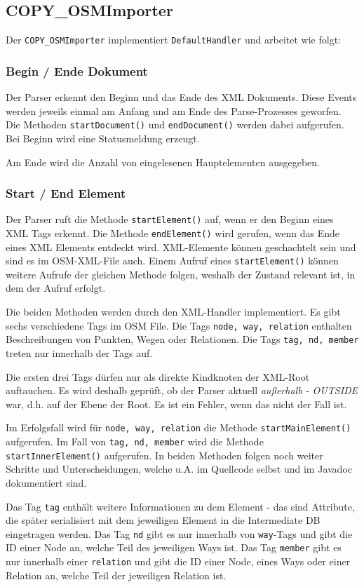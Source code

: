\subsection{COPY\_OSMImporter}
Der {\tt COPY\_OSMImporter} implementiert {\tt DefaultHandler} und arbeitet wie folgt:

\subsubsection{Begin / Ende Dokument}
Der Parser erkennt den Beginn und das Ende des XML Dokuments. Diese Events werden jeweils
einmal am Anfang und am Ende des Parse-Prozesses geworfen. Die Methoden {\tt startDocument()}
und {\tt endDocument()} werden dabei aufgerufen. Bei Beginn wird eine Statusmeldung erzeugt.

Am Ende wird die Anzahl von eingelesenen Hauptelementen ausgegeben.

\subsubsection{Start / End Element}
Der Parser ruft die Methode {\tt startElement()} auf, wenn er den Beginn eines XML
Tags erkennt. Die Methode {\tt endElement()} wird gerufen, wenn das Ende eines
XML Elements entdeckt wird. XML-Elemente können geschachtelt sein und sind es im
OSM-XML-File auch. Einem Aufruf eines {\tt startElement()} können weitere Aufrufe
der gleichen Methode folgen, weshalb der Zustand relevant ist, in dem der Aufruf erfolgt.

Die beiden Methoden werden durch den XML-Handler implementiert. Es gibt sechs verschiedene
Tags im OSM File. Die Tags {\tt node, way, relation} enthalten Beschreibungen von Punkten,
Wegen oder Relationen. Die Tags {\tt tag, nd, member} treten nur innerhalb der Tags
auf.

Die ersten drei Tags dürfen nur als direkte Kindknoten der XML-Root
auftauchen. Es wird deshalb geprüft, ob der Parser aktuell {\it außerhalb - OUTSIDE}
war, d.h. auf der Ebene der Root. Es ist ein Fehler, wenn das nicht der Fall ist.

Im Erfolgsfall wird für {\tt node, way, relation} die Methode {\tt startMainElement()} aufgerufen. Im Fall von {\tt tag, nd, 
member} wird die Methode {\tt startInnerElement()} aufgerufen. In beiden Methoden folgen noch weiter Schritte und Unterscheidungen, welche u.A. im Quellcode selbst und im Javadoc dokumentiert sind.

Das Tag {\tt tag} enthält weitere Informationen zu dem Element - das sind Attribute, 
die später serialisiert mit dem jeweiligen Element in die Intermediate DB eingetragen werden. 
Das Tag {\tt nd} gibt es nur innerhalb von {\tt way}-Tags und gibt die ID einer Node an, welche Teil des jeweiligen Ways ist. 
Das Tag {\tt member} gibt es nur innerhalb einer {\tt relation} und gibt die ID einer Node, eines Ways oder einer Relation an, welche Teil der jeweiligen Relation ist.

